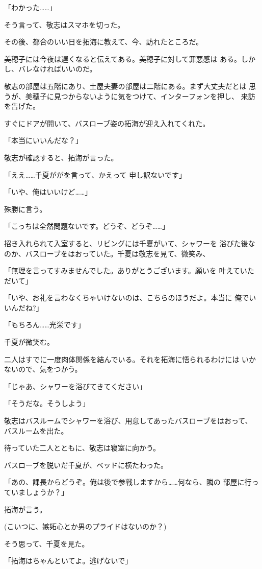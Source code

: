 ﻿\documentclass[
    book,tate,
    line_length=30zw,
    jafontsize=12pt,
    paper=b5j,
    landscape,
    ]{jlreq}
\begin{document}
「わかった……」

そう言って、敬志はスマホを切った。

その後、都合のいい日を拓海に教えて、今、訪れたところだ。

美穂子には今夜は遅くなると伝えてある。美穂子に対して罪悪感は
ある。しかし、バレなければいいのだ。

敬志の部屋は五階にあり、土屋夫妻の部屋は二階にある。まず大丈夫だとは
思うが、美穂子に見つからないように気をつけて、インターフォンを押し、
来訪を告げた。

すぐにドアが開いて、バスローブ姿の拓海が迎え入れてくれた。

「本当にいいんだな？」

敬志が確認すると、拓海が言った。

「ええ……千夏ががを言って、かえって
申し訳ないです」

「いや、俺はいいけど……」

殊勝に言う。

「こっちは全然問題ないです。どうぞ、どうぞ……」

招き入れられて入室すると、リビングには千夏がいて、シャワーを
浴びた後なのか、バスローブをはおっていた。千夏は敬志を見て、微笑み、

「無理を言ってすみませんでした。ありがとうございます。願いを
叶えていただいて」

「いや、お礼を言わなくちゃいけないのは、こちらのほうだよ。本当に
俺でいいんだね?」

「もちろん……光栄です」

千夏が微笑む。

二人はすでに一度肉体関係を結んでいる。それを拓海に悟られるわけには
いかないので、気をつかう。

「じゃあ、シャワーを浴びてきてください」

「そうだな。そうしよう」

敬志はバスルームでシャワーを浴び、用意してあったバスローブをはおって、
バスルームを出た。

待っていた二人とともに、敬志は寝室に向かう。

バスローブを脱いだ千夏が、ベッドに横たわった。

「あの、課長からどうぞ。俺は後で参戦しますから……何なら、隣の
部屋に行っていましょうか？」

拓海が言う。

(こいつに、嫉妬心とか男のプライドはないのか？)

そう思って、千夏を見た。

「拓海はちゃんといてよ。逃げないで」
\end{document}

